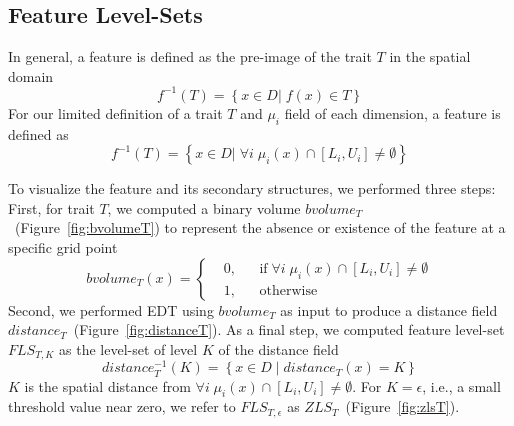 \vspace{-1mm}
\subsection{Feature Level-Sets}
\label{sec:fls}
In general, a feature is defined as the pre-image of the trait $T$ in the spatial domain
\begin{equation}
f^{-1}(T) = \left\{ x \in D |\; f(x) \in T \right\}
\end{equation}
%
For our limited definition of a trait $T$ and ${\mu}_{i}$ field of each dimension, a feature is defined as 
\begin{equation}
f^{-1}(T) = \left\{ x \in D |\; \forall i\;{\mu}_{i}(x) \cap [L_{i}, U_{i}] \neq \emptyset\right\}
\end{equation}

To visualize the feature and its secondary structures, we performed three steps:
%
First, for trait $T$, we computed a binary volume $bvolume_{T}$~(Figure~\ref{fig:bvolumeT}) to represent the absence or existence of the feature at a specific grid point
%
\begin{equation}
  bvolume_{T}(x) = \left \{
  \begin{aligned}
    &0, && \text{if}\; \forall i\; {\mu}_{i}(x) \cap [L_{i}, U_{i}] \neq \emptyset \\
    &1, && \text{otherwise}
  \end{aligned} \right.
\end{equation}
%
Second, we performed EDT using $bvolume_{T}$ as input to produce a distance field $distance_{T}$~(Figure~\ref{fig:distanceT}). 
%
%
As a final step, we computed feature level-set $FLS_{T,K}$ as the level-set of level $K$ of the distance field
%
\begin{equation} 
distance_{T}^{-1}(K) = \left\{ x \in D\; |\; distance_{T}(x) = K\right\}
\end{equation}
%
$K$ is the spatial distance from $\forall i\; \mu_{i}(x) \cap [L_{i}, U_{i}] \neq \emptyset$.
%
For $K = \epsilon$, i.e., a small threshold value near zero, we refer to $FLS_{T,\epsilon}$ as $ZLS_{T}$~(Figure~\ref{fig:zlsT}).
%
%

